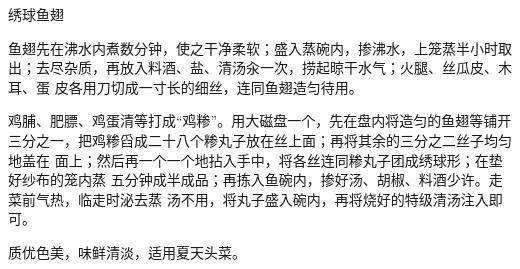\begin{recipe}{绣球鱼翅}

\ingredients


\preparation

\step 鱼翅先在沸水内煮数分钟，使之干净柔软；盛入蒸碗内，掺沸水，上笼蒸半小时取
出；去尽杂质，再放入料酒、盐、清汤汆一次，捞起晾干水气；火腿、丝瓜皮、木耳、蛋
皮各用刀切成一寸长的细丝，连同鱼翅造匀待用。

\step 鸡脯、肥膘、鸡蛋清等打成“鸡糁”。用大磁盘一个，先在盘内将造匀的鱼翅等铺开
三分之一，把鸡糁舀成二十八个糁丸子放在丝上面；再将其余的三分之二丝子均匀地盖在
面上；然后再一个一个地拈入手中，将各丝连同糁丸子团成绣球形；在垫好纱布的笼内蒸
五分钟成半成品；再拣入鱼碗内，掺好汤、胡椒、料酒少许。走菜前气热，临走时泌去蒸
汤不用，将丸子盛入碗内，再将烧好的特级清汤注入即可。

\features

质优色美，味鲜清淡，适用夏天头菜。

\end{recipe}

